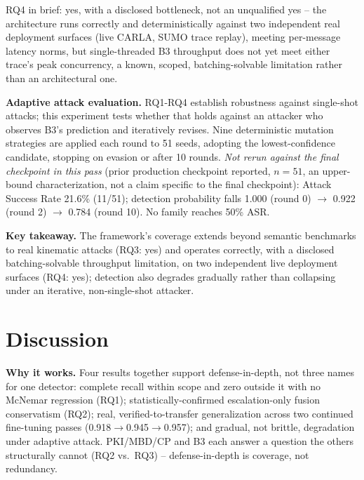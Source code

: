 \documentclass[conference]{IEEEtran}
\begin{document}
RQ4 in brief: yes, with a disclosed bottleneck, not an unqualified yes -- the architecture runs correctly and deterministically against two independent real deployment surfaces (live CARLA, SUMO trace replay), meeting per-message latency norms, but single-threaded B3 throughput does not yet meet either trace's peak concurrency, a known, scoped, batching-solvable limitation rather than an architectural one.

\textbf{Adaptive attack evaluation.} \label{sec:adaptive} RQ1-RQ4 establish robustness against single-shot attacks; this experiment tests whether that holds against an attacker who observes B3's prediction and iteratively revises. Nine deterministic mutation strategies are applied each round to 51 seeds, adopting the lowest-confidence candidate, stopping on evasion or after 10 rounds. \emph{Not rerun against the final checkpoint in this pass} (prior production checkpoint reported, $n{=}51$, an upper-bound characterization, not a claim specific to the final checkpoint): Attack Success Rate 21.6\% (11/51); detection probability falls 1.000 (round 0) $\to$ 0.922 (round 2) $\to$ 0.784 (round 10). No family reaches 50\% ASR.

\textbf{Key takeaway.} The framework's coverage extends beyond semantic benchmarks to real kinematic attacks (RQ3: yes) and operates correctly, with a disclosed batching-solvable throughput limitation, on two independent live deployment surfaces (RQ4: yes); detection also degrades gradually rather than collapsing under an iterative, non-single-shot attacker.

\section{Discussion}
\label{sec:discussion}
\textbf{Why it works.} Four results together support defense-in-depth, not three names for one detector: complete recall within scope and zero outside it with no McNemar regression (RQ1); statistically-confirmed escalation-only fusion conservatism (RQ2); real, verified-to-transfer generalization across two continued fine-tuning passes (0.918$\to$0.945$\to$0.957); and gradual, not brittle, degradation under adaptive attack. PKI/MBD/CP and B3 each answer a question the others structurally cannot (RQ2 vs.\ RQ3) -- defense-in-depth is coverage, not redundancy.
\end{document}
